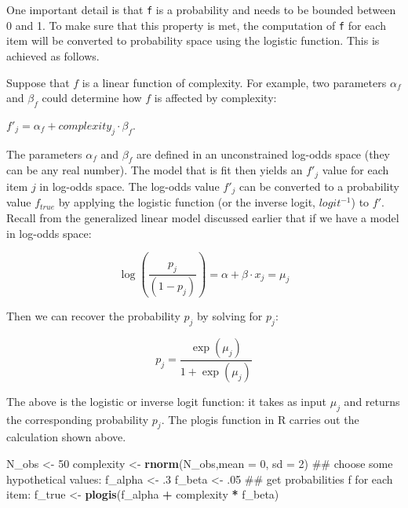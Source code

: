 \documentclass[12pt,]{krantz}
\newenvironment{Shaded}{\begin{snugshade}}{\end{snugshade}}
\newcommand{\KeywordTok}[1]{\textcolor[rgb]{0.13,0.29,0.53}{\textbf{#1}}}
\newcommand{\DataTypeTok}[1]{\textcolor[rgb]{0.13,0.29,0.53}{#1}}
\newcommand{\DecValTok}[1]{\textcolor[rgb]{0.00,0.00,0.81}{#1}}
\newcommand{\FloatTok}[1]{\textcolor[rgb]{0.00,0.00,0.81}{#1}}
\newcommand{\StringTok}[1]{\textcolor[rgb]{0.31,0.60,0.02}{#1}}
\newcommand{\OperatorTok}[1]{\textcolor[rgb]{0.81,0.36,0.00}{\textbf{#1}}}
\newcommand{\NormalTok}[1]{#1}
\theoremstyle{definition}
\theoremstyle{definition}
\theoremstyle{definition}
\theoremstyle{remark}
\begin{document}
One important detail is that \texttt{f} is a probability and needs to be
bounded between 0 and 1. To make sure that this property is met, the
computation of \texttt{f} for each item will be converted to probability
space using the logistic function. This is achieved as follows.

Suppose that \(f\) is a linear function of complexity. For example, two
parameters \(\alpha_f\) and \(\beta_f\) could determine how \(f\) is
affected by complexity:

\(f'_j=\alpha_f + complexity_j\cdot \beta_f\).

The parameters \(\alpha_f\) and \(\beta_f\) are defined in an
unconstrained log-odds space (they can be any real number). The model
that is fit then yields an \(f'_j\) value for each item \(j\) in
log-odds space. The log-odds value \(f'_j\) can be converted to a
probability value \(f_{true}\) by applying the logistic function (or the
inverse logit, \(logit^{-1}\)) to \(f'\). Recall from the generalized
linear model discussed earlier that if we have a model in log-odds
space:

\begin{equation}
\log \left(\frac{p_j}{(1-p_j)}\right) = \alpha + \beta\cdot x_j = \mu_j
\end{equation}

Then we can recover the probability \(p_j\) by solving for \(p_j\):

\begin{equation}
p_j = \frac{\exp(\mu_j)}{1+\exp(\mu_j)}
\end{equation}

The above is the logistic or inverse logit function: it takes as input
\(\mu_j\) and returns the corresponding probability \(p_j\). The plogis
function in R carries out the calculation shown above.

\begin{Shaded}
\begin{Highlighting}[]
\NormalTok{N_obs <-}\StringTok{ }\DecValTok{50}
\NormalTok{complexity <-}\StringTok{ }\KeywordTok{rnorm}\NormalTok{(N_obs,}\DataTypeTok{mean =} \DecValTok{0}\NormalTok{, }\DataTypeTok{sd =} \DecValTok{2}\NormalTok{)}
\NormalTok{## choose some hypothetical values:}
\NormalTok{f_alpha <-}\StringTok{ }\FloatTok{.3}
\NormalTok{f_beta <-}\StringTok{ }\FloatTok{.05}
\NormalTok{## get probabilities f for each item:}
\NormalTok{f_true <-}\StringTok{ }\KeywordTok{plogis}\NormalTok{(f_alpha }\OperatorTok{+}\StringTok{ }\NormalTok{complexity }\OperatorTok{*}\StringTok{ }\NormalTok{f_beta)}
\end{Highlighting}
\end{Shaded}
\end{document}
